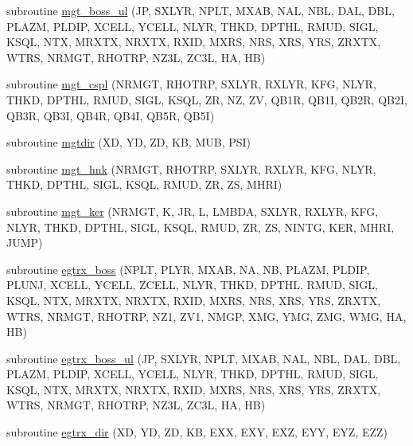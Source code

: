 \begin{DoxyCompactItemize}
\item 
subroutine \hyperlink{Leroi_8f90_adec9f2398e7872ff5617d3c0adffba35}{mgt\+\_\+boss\+\_\+ul} (JP, S\+X\+L\+YR, N\+P\+LT, M\+X\+AB, N\+AL, N\+BL, D\+AL, D\+BL, P\+L\+A\+ZM, P\+L\+D\+IP, X\+C\+E\+LL, Y\+C\+E\+LL, N\+L\+YR, T\+H\+KD, D\+P\+T\+HL, R\+M\+UD, S\+I\+GL, K\+S\+QL, N\+TX, M\+R\+X\+TX, N\+R\+X\+TX, R\+X\+ID, M\+X\+RS, N\+RS, X\+RS, Y\+RS, Z\+R\+X\+TX, W\+T\+RS, N\+R\+M\+GT, R\+H\+O\+T\+RP, N\+Z3L, Z\+C3L, HA, HB)
\item 
subroutine \hyperlink{Leroi_8f90_afd2db4ed971ee6e92ca6da7bece2caff}{mgt\+\_\+cspl} (N\+R\+M\+GT, R\+H\+O\+T\+RP, S\+X\+L\+YR, R\+X\+L\+YR, K\+FG, N\+L\+YR, T\+H\+KD, D\+P\+T\+HL, R\+M\+UD, S\+I\+GL, K\+S\+QL, ZR, NZ, ZV, Q\+B1R, Q\+B1I, Q\+B2R, Q\+B2I, Q\+B3R, Q\+B3I, Q\+B4R, Q\+B4I, Q\+B5R, Q\+B5I)
\item 
subroutine \hyperlink{Leroi_8f90_a96acb0ecb10b6c9a318ee0aa7cc60bdc}{mgtdir} (XD, YD, ZD, KB, M\+UB, P\+SI)
\item 
subroutine \hyperlink{Leroi_8f90_a8765868cf7e593af1ecbeadd492b6b49}{mgt\+\_\+hnk} (N\+R\+M\+GT, R\+H\+O\+T\+RP, S\+X\+L\+YR, R\+X\+L\+YR, K\+FG, N\+L\+YR, T\+H\+KD, D\+P\+T\+HL, S\+I\+GL, K\+S\+QL, R\+M\+UD, ZR, ZS, M\+H\+RI)
\item 
subroutine \hyperlink{Leroi_8f90_ad35190cbd2113592b83c9f1e721b8d07}{mgt\+\_\+ker} (N\+R\+M\+GT, K, JR, L, L\+M\+B\+DA, S\+X\+L\+YR, R\+X\+L\+YR, K\+FG, N\+L\+YR, T\+H\+KD, D\+P\+T\+HL, S\+I\+GL, K\+S\+QL, R\+M\+UD, ZR, ZS, N\+I\+N\+TG, K\+ER, M\+H\+RI, J\+U\+MP)
\item 
subroutine \hyperlink{Leroi_8f90_a7312ba6fbf8b492624e2663b1255893f}{egtrx\+\_\+boss} (N\+P\+LT, P\+L\+YR, M\+X\+AB, NA, NB, P\+L\+A\+ZM, P\+L\+D\+IP, P\+L\+U\+NJ, X\+C\+E\+LL, Y\+C\+E\+LL, Z\+C\+E\+LL, N\+L\+YR, T\+H\+KD, D\+P\+T\+HL, R\+M\+UD, S\+I\+GL, K\+S\+QL, N\+TX, M\+R\+X\+TX, N\+R\+X\+TX, R\+X\+ID, M\+X\+RS, N\+RS, X\+RS, Y\+RS, Z\+R\+X\+TX, W\+T\+RS, N\+R\+M\+GT, R\+H\+O\+T\+RP, N\+Z1, Z\+V1, N\+M\+GP, X\+MG, Y\+MG, Z\+MG, W\+MG, HA, HB)
\item 
subroutine \hyperlink{Leroi_8f90_a1770320680e91059231180f0654cce66}{egtrx\+\_\+boss\+\_\+ul} (JP, S\+X\+L\+YR, N\+P\+LT, M\+X\+AB, N\+AL, N\+BL, D\+AL, D\+BL, P\+L\+A\+ZM, P\+L\+D\+IP, X\+C\+E\+LL, Y\+C\+E\+LL, N\+L\+YR, T\+H\+KD, D\+P\+T\+HL, R\+M\+UD, S\+I\+GL, K\+S\+QL, N\+TX, M\+R\+X\+TX, N\+R\+X\+TX, R\+X\+ID, M\+X\+RS, N\+RS, X\+RS, Y\+RS, Z\+R\+X\+TX, W\+T\+RS, N\+R\+M\+GT, R\+H\+O\+T\+RP, N\+Z3L, Z\+C3L, HA, HB)
\item 
subroutine \hyperlink{Leroi_8f90_a6bbebe0c58cc288fcd56628de8860916}{egtrx\+\_\+dir} (XD, YD, ZD, KB, E\+XX, E\+XY, E\+XZ, E\+YY, E\+YZ, E\+ZZ)

\end{DoxyCompactItemize}
